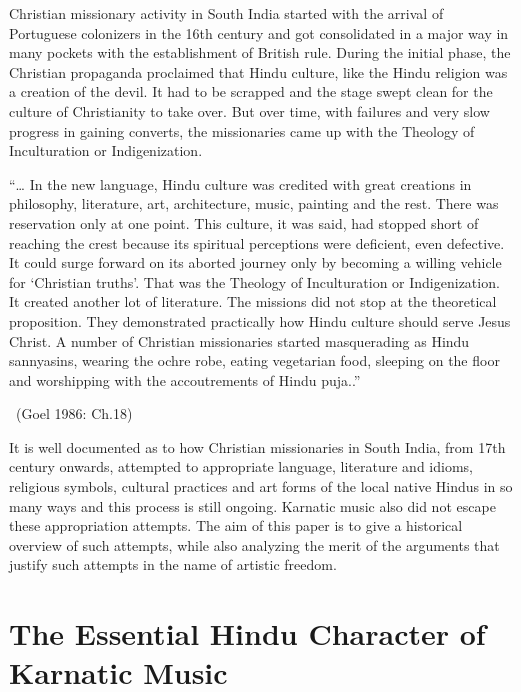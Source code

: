 Christian missionary activity in South India started with the arrival of Portuguese colonizers in the 16th century and got consolidated in a major way in many pockets with the establishment of British rule. During the initial phase, the Christian propaganda proclaimed that Hindu culture, like the Hindu religion was a creation of the devil. It had to be scrapped and the stage swept clean for the culture of Christianity to take over. But over time, with failures and very slow progress in gaining converts, the missionaries came up with the Theology of Inculturation or Indigenization.

\begin{myquote}
“… In the new language, Hindu culture was credited with great creations in philosophy, literature, art, architecture, music, painting and the rest. There was reservation only at one point. This culture, it was said, had stopped short of reaching the crest because its spiritual perceptions were deficient, even defective. It could surge forward on its aborted journey only by becoming a willing vehicle for ‘Christian truths’. That was the Theology of Inculturation or Indigenization. It created another lot of literature. The missions did not stop at the theoretical proposition. They demonstrated practically how Hindu culture should serve Jesus Christ. A number of Christian missionaries started masquerading as Hindu sannyasins, wearing the ochre robe, eating vegetarian food, sleeping on the floor and worshipping with the accoutrements of Hindu puja..” 

~\hfill (Goel 1986: Ch.18)
\end{myquote}

It is well documented as to how Christian missionaries in South India, from 17th century onwards, attempted to appropriate language, literature and idioms, religious symbols, cultural practices and art forms of the local native Hindus in so many ways and this process is still ongoing. Karnatic music also did not escape these appropriation attempts. The aim of this paper is to give a historical overview of such attempts, while also analyzing the merit of the arguments that justify such attempts in the name of artistic freedom.


\section*{The Essential Hindu Character of Karnatic Music}

